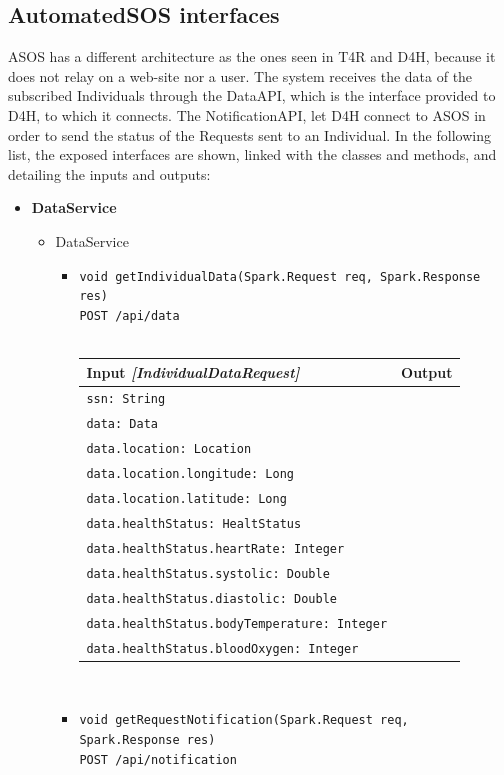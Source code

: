\documentclass[a4paper, hidelinks, 12pt]{report}
\begin{document}
\subsection{AutomatedSOS interfaces}
	ASOS has a different architecture as the ones seen in T4R and D4H, because it does not relay on a web-site nor a user. The system receives the data of the subscribed Individuals through the DataAPI, which is the interface provided to D4H, to which it connects. The NotificationAPI, let D4H connect to ASOS in order to send the status of the Requests sent to an Individual.  In the following list, the exposed interfaces are shown, linked with the classes and methods, and detailing the inputs and outputs:
	\begin{itemize}
		\item{\textbf{DataService}}
			\begin{itemize}
				\item{DataService}
					\begin{itemize}
						\item{\verb|void getIndividualData(Spark.Request req, Spark.Response res)|\\ \verb|POST /api/data|}\\\\
				\begin{tabular}{l | l}
				\textbf{Input} \textit{[IndividualDataRequest]} & \textbf{Output} \\
				\hline
					\verb|ssn: String| & \\
					\verb|data: Data| & \\
					\verb|data.location: Location| & \\
					\verb|data.location.longitude: Long| & \\
					\verb|data.location.latitude: Long| & \\
					\verb|data.healthStatus: HealtStatus| & \\
					\verb|data.healthStatus.heartRate: Integer| & \\
					\verb|data.healthStatus.systolic: Double| & \\
					\verb|data.healthStatus.diastolic: Double| & \\
					\verb|data.healthStatus.bodyTemperature: Integer| & \\
					\verb|data.healthStatus.bloodOxygen: Integer| & \\
				\end{tabular}\\
				\item{\verb|void getRequestNotification(Spark.Request req, Spark.Response res)|\\ \verb|POST /api/notification|}\\\\

\end{itemize}
\end{itemize}
\end{itemize}
\end{document}
